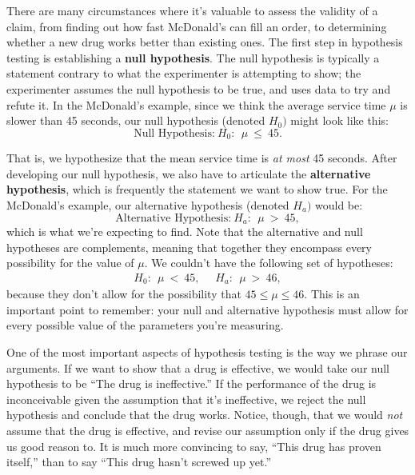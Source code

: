 There are many circumstances where it's valuable to assess the validity of a claim, from finding out how fast McDonald's can fill an order, to determining whether a new drug works better than existing ones. The first step in hypothesis testing is establishing a \textbf{null hypothesis}. The null hypothesis is typically a statement contrary to what the experimenter is attempting to show; the experimenter assumes the null hypothesis to be true, and uses data to try and refute it. In the McDonald's example, since we think the average service time $\mu$ is slower than 45 seconds, our null hypothesis (denoted $H_{0})$ might look like this:
\begin{equation*}
\textrm{Null\ \ Hypothesis:}\ H_0:\ \ \mu \ \leq\ 45.
\end{equation*}

That is, we hypothesize that the mean service time is \emph{at most} 45 seconds. After developing our null hypothesis, we also have to articulate the \textbf{alternative hypothesis}, which is frequently the statement we want to show true. For the McDonald's example, our alternative hypothesis (denoted $H_{a})$ would be:
\begin{equation*}
\textrm{Alternative Hypothesis:}\ H_a:\ \ \mu \ > \ 45,
\end{equation*}
which is what we're expecting to find. Note that the alternative and null hypotheses are complements, meaning that together they encompass every possibility for the value of $\mu$. We couldn't have the following set of hypotheses:
\begin{eqnarray}
H_0:\ \ \mu \ <\ 45, \ \ \ \ \ \ H_a:\ \ \mu\ >\ 46,
\end{eqnarray}
because they don't allow for the possibility that $45\le \mu \le 46$. This is an important point to remember: your null and alternative hypothesis must allow for every possible value of the parameters you're measuring.

One of the most important aspects of hypothesis testing is the way we phrase our arguments.  If we want to show that a drug is effective, we would take our null hypothesis to be ``The drug is ineffective.''  If the performance of the drug is inconceivable given the assumption that it's ineffective, we reject the null hypothesis and conclude that the drug works.  Notice, though, that we would \emph{not} assume that the drug is effective, and revise our assumption only if the drug gives us good reason to.  It is much more convincing to say, ``This drug has proven itself,'' than to say ``This drug hasn't screwed up yet.''


